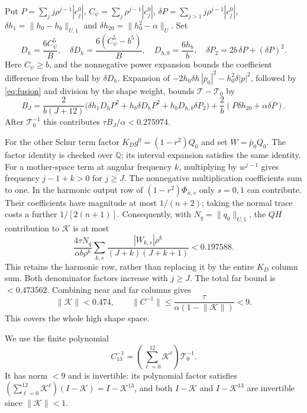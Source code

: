 \documentclass[11pt]{amsart}
\theoremstyle{remark}
\numberwithin{equation}{section}
\newcommand{\norm}[1]{\lVert#1\rVert}
\begin{document}
Put $P=\sum_jj\rho^{j-1}|c_j^0|$,
$C_\psi=\sum_j\rho^{j-1}|c_j^0|$,
$\delta P=\sum_{j>1}j\rho^{j-1}|c_j^0|$,
$\delta h_1=\norm{h_0-h_b}_{U,1}$ and
$\delta h_{20}=\norm{h_0^2-\alpha}_U$. Set
\[
 D_h=\frac{6C_\psi^5}{B},\quad
 \delta D_h=\frac{6(C_\psi^5-b^5)}B,\quad
 D_{h,b}=\frac{6h_b}b,\quad
 \delta P_2=2b\,\delta P+(\delta P)^2.
\]
Here $C_\psi\ge b$, and the nonnegative power expansion bounds the
coefficient difference from the ball by $\delta D_h$.
Expansion of $-2h_0\delta h\,|p_0|^2-h_0^2\delta|p|^2$, followed by
\eqref{eq:fusion} and division by the shape weight, bounds $\mathcal T-\mathcal T_0$ by
\[
 B_J=\frac2{b(J+12)}
 \bigl(\delta h_1D_hP^2+h_b\delta D_hP^2+
       h_bD_{h,b}\delta P_2\bigr)
       +\frac2b(P\delta h_{20}+\alpha\delta P).
\]
After $\mathcal T_0^{-1}$ this contributes $\tau B_J/\alpha<0.275974$.

For the other Schur term factor $K_Dg^0=(1-r^2)Q_0$ and set
$W=\bar p_0Q_0$. The factor identity is checked over $\mathbb Q$;
its interval expansion satisfies the same identity.
For a mother-space term at angular frequency $k$, multiplying by
$w^{j-1}$ gives frequency $j-1+k>0$ for $j\ge J$.
The nonnegative multiplication coefficients sum to one. In the
harmonic output row of $(1-r^2)\Phi_{n,s}$ only $s=0,1$ can contribute.
Their coefficients have magnitude at most $1/(n+2)$; taking the normal
trace costs a further $1/[2(n+1)]$. Consequently, with
$N_q=\norm{q_0}_{U,1}$, the $QH$ contribution to $\mathcal K$ is at most
\begin{equation}\label{eq:r14fartrace}
 \frac{4\tau N_q}{\alpha b\rho^6}
 \sum_{k,s}\frac{|W_{k,s}|\rho^k}{(J+k)(J+k+1)}
 <0.197588.
\end{equation}
This retains the harmonic row, rather than replacing it by the entire
$K_D$ column sum. Both denominator factors increase with $j\ge J$.
The total far bound is $<0.473562$. Combining near and far columns gives
\begin{equation}\label{eq:r14K}
 \norm{\mathcal K}<0.474,\qquad
 \norm{C^{-1}}\le\frac{\tau}{\alpha(1-\norm{\mathcal K})}<9.
\end{equation}
This covers the whole high shape space.

We use the finite polynomial
\begin{equation}\label{eq:CN}
 C_{13}^{-1}=\left(\sum_{\ell=0}^{12}\mathcal K^\ell\right)\mathcal T_0^{-1}.
\end{equation}
It has norm $<9$ and is invertible: its polynomial factor satisfies
$(\sum_{\ell=0}^{12}\mathcal K^\ell)(I-\mathcal K)=I-\mathcal K^{13}$, and both $I-\mathcal K$ and
$I-\mathcal K^{13}$ are invertible since $\norm{\mathcal K}<1$.
\end{document}
